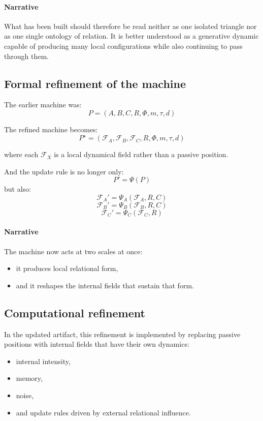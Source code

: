 \documentclass[11pt]{article}
\begin{document}
\paragraph{Narrative}
What has been built should therefore be read neither as one isolated triangle
nor as one single ontology of relation.
It is better understood as a generative dynamic capable of producing many local
configurations while also continuing to pass through them.

\subsection*{Formal refinement of the machine}

The earlier machine was:
\[
P = (A,B,C,R,\Phi,m,\tau,d)
\]

The refined machine becomes:
\[
P^\star = (\mathcal{F}_A,\mathcal{F}_B,\mathcal{F}_C,R,\Phi,m,\tau,d)
\]

where each $\mathcal{F}_X$ is a local dynamical field rather than a passive position.

And the update rule is no longer only:
\[
P' = \Psi(P)
\]
but also:
\[
\mathcal{F}_A' = \Psi_A(\mathcal{F}_A, R, C)
\]
\[
\mathcal{F}_B' = \Psi_B(\mathcal{F}_B, R, C)
\]
\[
\mathcal{F}_C' = \Psi_C(\mathcal{F}_C, R)
\]

\paragraph{Narrative}
The machine now acts at two scales at once:
\begin{itemize}
\item it produces local relational form,
\item and it reshapes the internal fields that sustain that form.
\end{itemize}

\subsection*{Computational refinement}

In the updated artifact, this refinement is implemented by replacing passive
positions with internal fields that have their own dynamics:
\begin{itemize}
\item internal intensity,
\item memory,
\item noise,
\item and update rules driven by external relational influence.
\end{itemize}
\end{document}
